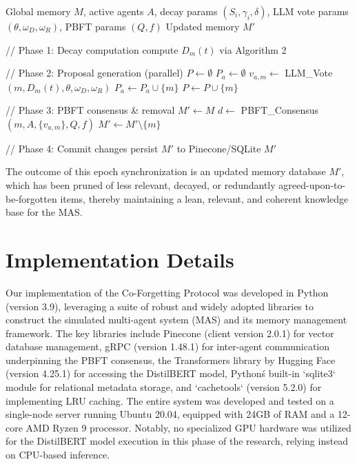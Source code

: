 \documentclass[conference]{IEEEtran}
\begin{document}
\begin{algorithm}[H]
\caption{Epoch Synchronization for Collective Memory Management}
\label{alg:epoch_sync}
\begin{algorithmic}[1]
\Require Global memory $M$, active agents $A$, decay params $(S_i,\gamma_i,\delta)$, LLM vote params $(\theta,\omega_D,\omega_R)$, PBFT params $(Q,f)$
\Ensure Updated memory $M'$

\State // Phase 1: Decay computation  
  \State compute $D_m(t)$ via Algorithm 2  
\EndFor

\State // Phase 2: Proposal generation (parallel)
\State $P \leftarrow \emptyset$
  \State $P_a \leftarrow \emptyset$
    \State $v_{a,m} \leftarrow$ LLM\_Vote$(m, D_m(t), \theta, \omega_D, \omega_R)$  
      \State $P_a \leftarrow P_a \cup \{m\}$
      \State $P \leftarrow P \cup \{m\}$
    \EndIf
  \EndFor
\EndFor

\State // Phase 3: PBFT consensus \& removal
\State $M' \leftarrow M$
  \State $d \leftarrow$ PBFT\_Consensus$(m, A, \{v_{a,m}\}, Q, f)$
    \State $M' \leftarrow M' \setminus \{m\}$
  \EndIf
\EndFor

\State // Phase 4: Commit changes
\State persist $M'$ to Pinecone/SQLite
\State \Return $M'$
\end{algorithmic}
\end{algorithm}

The outcome of this epoch synchronization is an updated memory database $M'$, which has been pruned of less relevant, decayed, or redundantly agreed-upon-to-be-forgotten items, thereby maintaining a lean, relevant, and coherent knowledge base for the MAS.


\section{Implementation Details}
\label{sec:implementation}

Our implementation of the Co-Forgetting Protocol was developed in Python (version 3.9), leveraging a suite of robust and widely adopted libraries to construct the simulated multi-agent system (MAS) and its memory management framework. The key libraries include Pinecone (client version 2.0.1) for vector database management, gRPC (version 1.48.1) for inter-agent communication underpinning the PBFT consensus, the Transformers library by Hugging Face (version 4.25.1) for accessing the DistilBERT model, Python\'s built-in `sqlite3` module for relational metadata storage, and `cachetools` (version 5.2.0) for implementing LRU caching. The entire system was developed and tested on a single-node server running Ubuntu 20.04, equipped with 24GB of RAM and a 12-core AMD Ryzen 9 processor. Notably, no specialized GPU hardware was utilized for the DistilBERT model execution in this phase of the research, relying instead on CPU-based inference.
\end{document}
